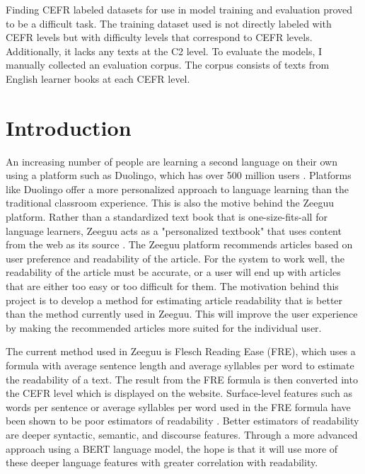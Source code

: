 \documentclass[11pt,a4paper]{article}
\begin{document}
Finding CEFR labeled datasets for use in model training and evaluation proved
to be a difficult task. The training dataset used is not directly labeled with
CEFR levels but with difficulty levels that correspond to CEFR levels.
Additionally, it lacks any texts at the C2 level. To evaluate the models, I
manually collected an evaluation corpus. The corpus consists of texts from
English learner books at each CEFR level.

\newpage

\tableofcontents

\newpage

\section{Introduction}

An increasing number of people are learning a second language on their own
using a platform such as Duolingo, which has over 500 million users
\parencite{duolingo2022Duolingo}. Platforms like Duolingo offer a more
personalized approach to language learning than the traditional classroom
experience. This is also the motive behind the Zeeguu platform. Rather than a
standardized text book that is one-size-fits-all for language learners,
Zeeguu acts as a "personalized textbook" that uses content from the web as its
source \parencite{10.1145/3173574.3173912}. The Zeeguu platform recommends
articles based on user preference and readability of the article. For the system to
work well, the readability of the article must be accurate, or a user will end up
with articles that are either too easy or too difficult for them.
The motivation behind this project is to develop a method for estimating article
readability that is better than the method currently used in Zeeguu. This will
improve the user experience by making the recommended articles more suited for
the individual user.

The current method used in Zeeguu is Flesch Reading Ease (FRE), which uses
a formula with average sentence length and average syllables per word to
estimate the readability of a text. The result from the FRE formula is then
converted into the CEFR level which is displayed on the website. Surface-level features such as words per
sentence or average syllables per word used in the FRE formula have been shown
to be poor estimators of readability \parencite{pitler-nenkova-2008-revisiting}.
Better estimators of readability are deeper syntactic, semantic, and discourse
features. Through a more advanced approach using a BERT language model, the
hope is that it will use more of these deeper language features with greater
correlation with readability.
\end{document}

